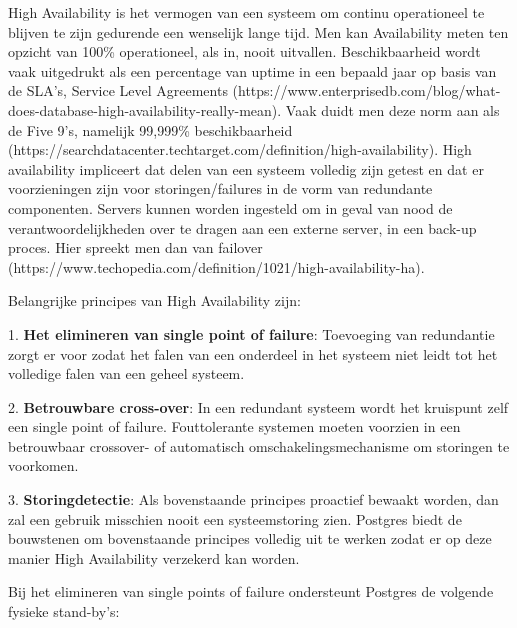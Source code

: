


High Availability is het vermogen van een systeem om continu operationeel te blijven te zijn gedurende een wenselijk lange tijd. Men kan Availability meten ten opzicht van 100\% operationeel, als in, nooit uitvallen. Beschikbaarheid wordt vaak uitgedrukt als een percentage van uptime in een bepaald jaar op basis van de SLA's, Service Level Agreements (https://www.enterprisedb.com/blog/what-does-database-high-availability-really-mean). Vaak duidt men deze norm aan als de Five 9's, namelijk 99,999\% beschikbaarheid (https://searchdatacenter.techtarget.com/definition/high-availability). High availability impliceert dat delen van een systeem volledig zijn getest en dat er voorzieningen zijn voor storingen/failures in de vorm van redundante componenten. Servers kunnen worden ingesteld om in geval van nood de verantwoordelijkheden over te dragen aan een externe server, in een back-up proces. Hier spreekt men dan van failover (https://www.techopedia.com/definition/1021/high-availability-ha).


Belangrijke principes van High Availability zijn:

1. \textbf{Het elimineren van single point of failure}: Toevoeging van redundantie zorgt er voor zodat het falen van een onderdeel in het systeem niet leidt tot het volledige falen van een geheel systeem.

2. \textbf{Betrouwbare cross-over}: In een redundant systeem wordt het kruispunt zelf een single point of failure. Fouttolerante systemen moeten voorzien in een betrouwbaar crossover- of automatisch omschakelingsmechanisme om storingen te voorkomen.

3. \textbf{Storingdetectie}: Als bovenstaande principes proactief bewaakt worden, dan zal een gebruik misschien nooit een systeemstoring zien.
Postgres biedt de bouwstenen om bovenstaande principes volledig uit te werken zodat er op deze manier High Availability verzekerd kan worden.


Bij het elimineren van single points of failure ondersteunt Postgres de volgende fysieke stand-by's:

